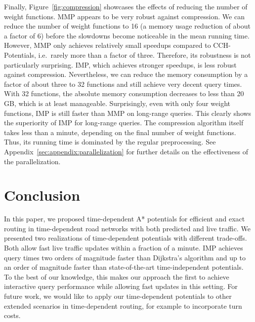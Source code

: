 \documentclass[a4paper,UKenglish,cleveref, autoref, thm-restate,anonymous]{lipics-v2021}
\begin{document}
Finally, Figure~\ref{fig:compression} showcases the effects of reducing the number of weight functions.
MMP appears to be very robust against compression.
We can reduce the number of weight functions to 16 (a memory usage reduction of about a factor of 6) before the slowdowns become noticeable in the mean running time.
However, MMP only achieves relatively small speedups compared to CCH-Potentials, i.e.\ rarely more than a factor of three.
Therefore, its robustness is not particularly surprising.
IMP, which achieves stronger speedups, is less robust against compression.
Nevertheless, we can reduce the memory consumption by a factor of about three to 32 functions and still achieve very decent query times.
With 32 functions, the absolute memory consumption decreases to less than 20\,GB, which is at least manageable.
Surprisingly, even with only four weight functions, IMP is still faster than MMP on long-range queries.
This clearly shows the superiority of IMP for long-range queries.
The compression algorithm itself takes less than a minute, depending on the final number of weight functions.
Thus, its running time is dominated by the regular preprocessing.
See Appendix~\ref{sec:appendix:parallelization} for further details on the effectiveness of the parallelization.

\section{Conclusion}

In this paper, we proposed time-dependent A* potentials for efficient and exact routing in time-dependent road networks with both predicted and live traffic.
We presented two realizations of time-dependent potentials with different trade-offs.
Both allow fast live traffic updates within a fraction of a minute.
IMP achieves query times two orders of magnitude faster than Dijkstra's algorithm and up to an order of magnitude faster than state-of-the-art time-independent potentials.
To the best of our knowledge, this makes our approach the first to achieve interactive query performance while allowing fast updates in this setting.
For future work, we would like to apply our time-dependent potentials to other extended scenarios in time-dependent routing, for example to incorporate turn costs.

\end{document}

